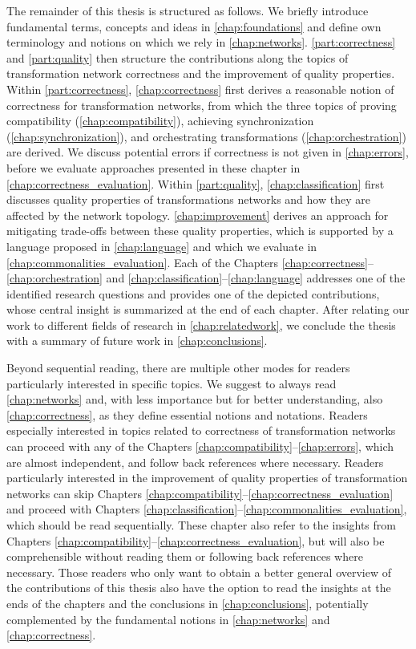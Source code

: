 The remainder of this thesis is structured as follows.
We briefly introduce fundamental terms, concepts and ideas in \autoref{chap:foundations} and define own terminology and notions on which we rely in \autoref{chap:networks}.
\autoref{part:correctness} and \autoref{part:quality} then structure the contributions along the topics of transformation network correctness and the improvement of quality properties.
Within \autoref{part:correctness}, \autoref{chap:correctness} first derives a reasonable notion of correctness for transformation networks, from which the three topics of proving compatibility (\autoref{chap:compatibility}), achieving synchronization (\autoref{chap:synchronization}), and orchestrating transformations (\autoref{chap:orchestration}) are derived.
We discuss potential errors if correctness is not given in \autoref{chap:errors}, before we evaluate approaches presented in these chapter in \autoref{chap:correctness_evaluation}.
Within \autoref{part:quality}, \autoref{chap:classification} first discusses quality properties of transformations networks and how they are affected by the network topology.
\autoref{chap:improvement} derives an approach for mitigating trade-offs between these quality properties, which is supported by a language proposed in \autoref{chap:language} and which we evaluate in \autoref{chap:commonalities_evaluation}.
Each of the Chapters \ref{chap:correctness}--\ref{chap:orchestration} and \ref{chap:classification}--\ref{chap:language} addresses one of the identified research questions and provides one of the depicted contributions, whose central insight is summarized at the end of each chapter.
After relating our work to different fields of research in \autoref{chap:relatedwork}, we conclude the thesis with a summary of future work in \autoref{chap:conclusions}.

Beyond sequential reading, there are multiple other modes for readers particularly interested in specific topics.
We suggest to always read \autoref{chap:networks} and, with less importance but for better understanding, also \autoref{chap:correctness}, as they define essential notions and notations.
Readers especially interested in topics related to correctness of transformation networks can proceed with any of the Chapters \ref{chap:compatibility}--\ref{chap:errors}, which are almost independent, and follow back references where necessary.
Readers particularly interested in the improvement of quality properties of transformation networks can skip Chapters \ref{chap:compatibility}--\ref{chap:correctness_evaluation} and proceed with Chapters \ref{chap:classification}--\ref{chap:commonalities_evaluation}, which should be read sequentially.
These chapter also refer to the insights from Chapters \ref{chap:compatibility}--\ref{chap:correctness_evaluation}, but will also be comprehensible without reading them or following back references where necessary.
Those readers who only want to obtain a better general overview of the contributions of this thesis also have the option to read the insights at the ends of the chapters and the conclusions in \autoref{chap:conclusions}, potentially complemented by the fundamental notions in \autoref{chap:networks} and \autoref{chap:correctness}.


